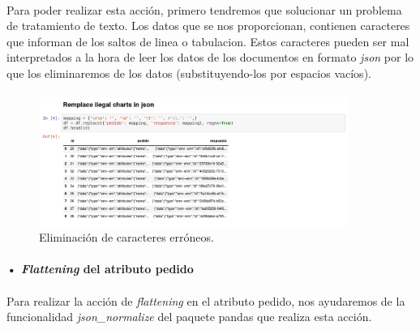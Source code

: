 \documentclass[10pt,a4paper,oneside]{book}
\begin{document}
\paragraph{}
Para poder realizar esta acción, primero tendremos que solucionar un problema de tratamiento de texto. Los datos que se nos proporcionan, contienen caracteres que informan de los saltos de linea o tabulacion. Estos caracteres pueden ser mal interpretados a la hora de leer los datos de los documentos en formato \textit{json} por lo que los eliminaremos de los datos (substituyendo-los por espacios vacíos).

\paragraph{}
\begin{figure}[!htb]
  \centering
  \includegraphics[width=0.9\textwidth]{images/metodologia-eliminar-caracteres-prohibidos.png}
  \caption{Eliminación de caracteres erróneos.}
\end{figure}

\newpage
\paragraph{• \textit{Flattening} del atributo pedido}

\paragraph{}
Para realizar la acción de \textit{flattening} en el atributo pedido, nos ayudaremos de la funcionalidad \textit{json\_normalize} del paquete pandas que realiza esta acción. 
\end{document}
